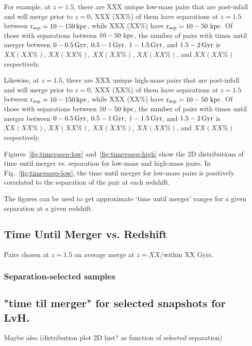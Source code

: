 \documentclass[twocolumn,linenumbers]{aastex631}
\newcommand{\rsep}{\ensuremath{\rm r_{sep}}}
\begin{document}
For example, at $z=1.5$, there are XXX unique low-mass pairs that are post-infall and will merge prior to $z=0$, XXX (XX\%) of them have separations at $z=1.5$ between $\rsep=10-150\,kpc$, while XXX (XX\%) have $\rsep=10-50\,\kpc$. Of those with separations between $10-50\,\mathrm{\,kpc}$, the number of pairs with times until merger between $0-0.5\,\mathrm{Gyr}$, $0.5-1\,\mathrm{Gyr}$, $1-1.5\,\mathrm{Gyr}$, and $1.5-2\,\mathrm{Gyr}$ is $XX(XX\%)$, $XX(XX\%)$, $XX(XX\%)$, $XX(XX\%)$, and $XX(XX\%)$ respectively. 

Likewise, at $z=1.5$, there are XXX unique high-mass pairs that are post-infall and will merge prior to $z=0$, XXX (XX\%) of them have separations at $z=1.5$ between $\rsep=10-150\,kpc$, while XXX (XX\%) have $\rsep=10-50\,\kpc$. 
Of those with separations between $10-50\,\mathrm{\,kpc}$, the number of pairs with times until merger between $0-0.5\,\mathrm{Gyr}$, $0.5-1\,\mathrm{Gyr}$, $1-1.5\,\mathrm{Gyr}$, and $1.5-2\,\mathrm{Gyr}$ is $XX(XX\%)$, $XX(XX\%)$, $XX(XX\%)$, $XX(XX\%)$, and $XX(XX\%)$ respectively.

Figures~\ref{fig:timevssep-low} and~\ref{fig:timevssep-high} show the 2D distributions of time until merger vs. separation for low-mass and high-mass pairs. 
In Fig.~\ref{fig:timevssep-low}, the time until merger for low-mass pairs is positively correlated to the separation of the pair at each redshift. 

The figures can be used to get approximate `time until merger' ranges for a given separation at a given redshift.


% 



\subsection{Time Until Merger vs. Redshift}

Pairs chosen at $z=1.5$ on average merge at $z=XX$/within XX Gyrs.

\subsubsection{Separation-selected samples}

\subsection{"time til merger" for selected snapshots for LvH.}
Maybe also (distribution plot 2D hist? as function of selected separation)
\end{document}
